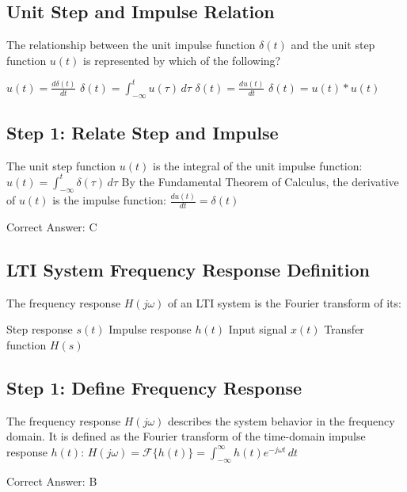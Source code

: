 \clearpage

\subsection{Unit Step and Impulse Relation}

The relationship between the unit impulse function $\delta(t)$ and the unit step function $u(t)$ is represented by which of the following?

\begin{choices}
    \choice $u(t) = \frac{d\delta(t)}{dt}$
    \choice $\delta(t) = \int_{-\infty}^{t} u(\tau)\, d\tau$
    \correctchoice $\delta(t) = \frac{du(t)}{dt}$
    \choice $\delta(t) = u(t) * u(t)$
\end{choices}

\begin{solution}

\subsection*{Step 1: Relate Step and Impulse}
The unit step function $u(t)$ is the integral of the unit impulse function:
$u(t) = \int_{-\infty}^{t} \delta(\tau)\, d\tau$
By the Fundamental Theorem of Calculus, the derivative of $u(t)$ is the impulse function:
$\frac{du(t)}{dt} = \delta(t)$

Correct Answer: C
\end{solution}

\clearpage

\subsection{LTI System Frequency Response Definition}

The frequency response $H(j\omega)$ of an LTI system is the Fourier transform of its:

\begin{choices}
    \choice Step response $s(t)$
    \correctchoice Impulse response $h(t)$
    \choice Input signal $x(t)$
    \choice Transfer function $H(s)$
\end{choices}

\begin{solution}

\subsection*{Step 1: Define Frequency Response}
The frequency response $H(j\omega)$ describes the system behavior in the frequency domain. It is defined as the Fourier transform of the time-domain impulse response $h(t)$:
$H(j\omega) = \mathcal{F}\{h(t)\} = \int_{-\infty}^{\infty} h(t) e^{-j\omega t}\, dt$

Correct Answer: B
\end{solution}

